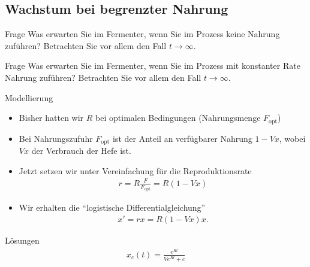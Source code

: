 \documentclass[notheorems,hidelinks,aspectratio=1610]{beamer}
\begin{document}
\subsection{Wachstum bei begrenzter Nahrung}
\frame{\subtoc}

\begin{frame}
  \begin{exampleblock}{Frage}
    Was erwarten Sie im Fermenter, wenn Sie im Prozess keine Nahrung
    zuführen? Betrachten Sie vor allem den Fall $t\to\infty$.
  \end{exampleblock}
\end{frame}

\begin{frame}
  \begin{exampleblock}{Frage}
    Was erwarten Sie im Fermenter, wenn Sie im Prozess mit konstanter
    Rate Nahrung zuführen? Betrachten Sie vor allem den Fall
    $t\to\infty$.
  \end{exampleblock}
\end{frame}

\begin{frame}{Modellierung}
  \begin{itemize}
  \item Bisher hatten wir $R$ bei optimalen Bedingungen (Nahrungsmenge
    $F_{\text{opt}}$)
  \item Bei Nahrungszufuhr $F_{\text{opt}}$ ist der Anteil an verfügbarer Nahrung $1-Vx$, wobei $Vx$ der Verbrauch der Hefe ist.
  \item Jetzt setzen wir unter Vereinfachung für die Reproduktionsrate
    \begin{gather*}
      r = R \frac{F}{F_{\text{opt}}} = R (1-Vx)
    \end{gather*}
  \item Wir erhalten die ``logistische Differentialgleichung''
    \begin{gather*}
      x' = rx = R (1-Vx) x.
    \end{gather*}
  \end{itemize}
\end{frame}

\begin{frame}
  \begin{block}{Lösungen}
    \begin{gather*}
      x_c(t) = \frac{e^{Rt}}{V e^{Rt}+c}
    \end{gather*}
  \end{block}
\end{frame}
\end{document}
